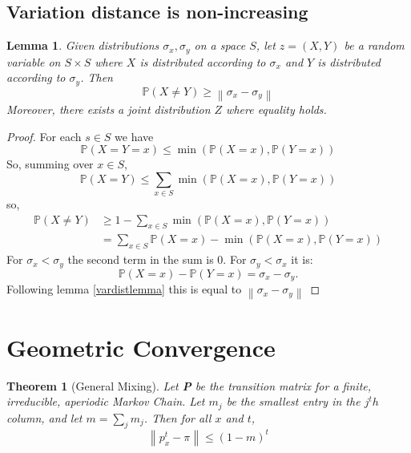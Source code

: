 \documentclass[11pt]{article}
\newcommand{\norm}[1]{\left\lVert#1\right\rVert}
\newtheorem{thm}{Theorem}[section]
\newtheorem{lem}{Lemma}[section]
\begin{document}
\subsection{Variation distance is non-increasing}
\begin{lem}
Given distributions \(\sigma_x, \sigma_y\) on a space \(S\), let \(z = \left(X,Y\right)\) be a random variable on \(S \times S\) where \(X\) is distributed according to \(\sigma_x\) and \(Y\) is distributed according to \(\sigma_y\). Then
\begin{equation}
\mathbb{P}\left(X \neq Y\right) \geq \norm{\sigma_x - \sigma_y}
\end{equation}
Moreover, there exists a joint distribution \(Z\) where equality holds.
\label{noninclemma}
\end{lem}
\begin{proof}
For each \(s \in S\) we have
\begin{equation}
\mathbb{P}\left(X = Y = x\right) \leq \min\left({\mathbb{P}\left(X=x\right),\mathbb{P}\left(Y=x\right)}\right)
\end{equation}
So, summing over \(x\in S\),
\begin{equation}
\mathbb{P}\left(X = Y\right) \leq \sum_{x\in S} \min\left({\mathbb{P}\left(X=x\right),\mathbb{P}\left(Y=x\right)}\right)
\end{equation}
so,
\begin{align}
\mathbb{P}\left(X \neq Y\right) &\geq 1 - \sum_{x\in S} \min\left({\mathbb{P}\left(X=x\right),\mathbb{P}\left(Y=x\right)}\right)\\
&= \sum_{x\in S} \mathbb{P}\left(X=x\right)- \min\left({\mathbb{P}\left(X=x\right),\mathbb{P}\left(Y=x\right)}\right)
\end{align}
For \(\sigma_x < \sigma_y\) the second term in the sum is 0. For \(\sigma_y < \sigma_x\) it is:
\begin{equation}
\mathbb{P}\left(X=x\right)- \mathbb{P}\left(Y=x\right) = \sigma_x - \sigma_y.
\end{equation}
Following lemma \ref{vardistlemma} this is equal to \(\norm{\sigma_x - \sigma_y}\)
\end{proof}
\section{Geometric Convergence}
\begin{thm}[General Mixing]
Let \textbf{P} be the transition matrix for a finite, irreducible, aperiodic Markov Chain. Let \(m_j\) be the smallest entry in the \(j^th\) column, and let \(m = \sum_j m_j\). Then for all \(x\) and \(t\), 
\begin{equation}
\norm{p_x^t - \pi} \leq \left(1-m\right)^t
\end{equation}
\end{thm}
\end{document}
